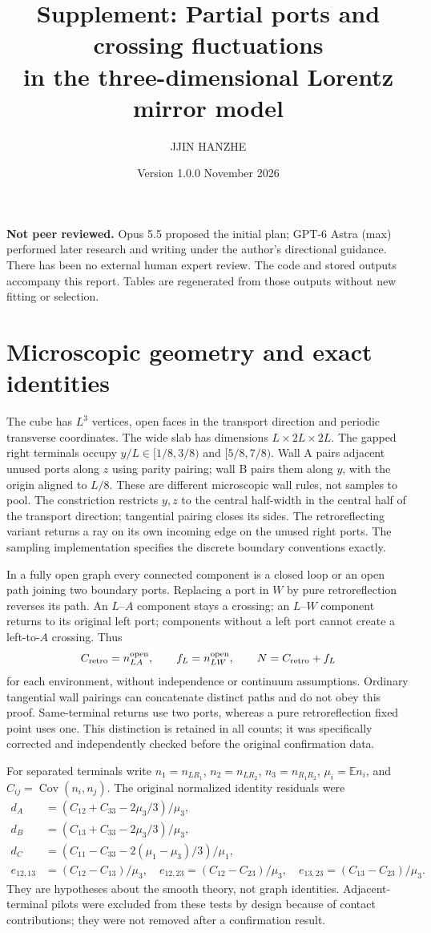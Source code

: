 \documentclass[10pt,a4paper]{article}
\title{Supplement: Partial ports and crossing fluctuations\\in the three-dimensional Lorentz mirror model}
\author{JJIN HANZHE}
\date{Version 1.0.0 \quad 3 November 2026}
\newcommand{\E}{\mathbb E}
\newcommand{\Cov}{\operatorname{Cov}}
\begin{document}
\maketitle
\noindent\textbf{Not peer reviewed.} Opus 5.5 proposed the initial plan;
GPT-6 Astra (max) performed later research and writing under the author's
directional guidance. There has been no external human expert review.
The code and stored outputs accompany this report. Tables are regenerated
from those outputs without new fitting or selection.
\tableofcontents

\section{Microscopic geometry and exact identities}
The cube has \(L^3\) vertices, open faces in the transport direction and
periodic transverse coordinates. The wide slab has dimensions \(L\times2L\times2L\).
The gapped right terminals occupy \(y/L\in[1/8,3/8)\) and \([5/8,7/8)\).
Wall A pairs adjacent unused ports along \(z\) using parity pairing;
wall B pairs them along \(y\), with the origin aligned to \(L/8\).
These are different microscopic wall rules, not samples to pool.
The constriction restricts \(y,z\) to the central half-width in the central
half of the transport direction; tangential pairing closes its sides.
The retroreflecting variant returns a ray on its own incoming edge on the
unused right ports. The sampling implementation specifies the discrete
boundary conventions exactly.

In a fully open graph every connected component is a closed loop or an
open path joining two boundary ports. Replacing a port in \(W\) by pure
retroreflection reverses its path. An \(L\)--\(A\) component stays a crossing;
an \(L\)--\(W\) component returns to its original left port; components
without a left port cannot create a left-to-\(A\) crossing. Thus
\[
C_{\rm retro}=n_{LA}^{\rm open},\qquad
f_L=n_{LW}^{\rm open},\qquad N=C_{\rm retro}+f_L
\]
for each environment, without independence or continuum assumptions.
Ordinary tangential wall pairings can concatenate distinct paths and do
not obey this proof. Same-terminal returns use two ports, whereas a pure
retroreflection fixed point uses one. This distinction is retained in all
counts; it was specifically corrected and independently checked before
the original confirmation data.

For separated terminals write \(n_1=n_{LR_1}\), \(n_2=n_{LR_2}\),
\(n_3=n_{R_1R_2}\), \(\mu_i=\E n_i\), and
\(C_{ij}=\Cov(n_i,n_j)\). The original normalized identity residuals were
\begin{align}
d_A&=(C_{12}+C_{33}-2\mu_3/3)/\mu_3,\\
d_B&=(C_{13}+C_{33}-2\mu_3/3)/\mu_3,\\
d_C&=(C_{11}-C_{33}-2(\mu_1-\mu_3)/3)/\mu_1,\\
e_{12,13}&=(C_{12}-C_{13})/\mu_3,\quad
e_{12,23}=(C_{12}-C_{23})/\mu_3,\quad
e_{13,23}=(C_{13}-C_{23})/\mu_3 .
\end{align}
They are hypotheses about the smooth theory, not graph identities.
Adjacent-terminal pilots were excluded from these tests by design because
of contact contributions; they were not removed after a confirmation result.
\end{document}
